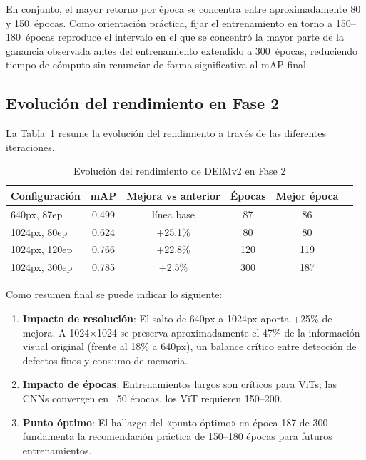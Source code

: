 En conjunto, el mayor retorno por época se concentra entre aproximadamente 80 y 150~épocas. Como orientación práctica, fijar el entrenamiento en torno a 150--180~épocas reproduce el intervalo en el que se concentró la mayor parte de la ganancia observada antes del entrenamiento extendido a 300~épocas, reduciendo tiempo de cómputo sin renunciar de forma significativa al mAP final.

\FloatBarrier
\subsection{Evolución del rendimiento en Fase 2}

La Tabla~\ref{tab:evolucion_fase2} resume la evolución del rendimiento a través de las diferentes iteraciones.

\begin{table}[htbp]
\centering
\begin{tabular}{lccccc}
\toprule
\textbf{Configuración} & \textbf{mAP} & \textbf{Mejora vs anterior} & \textbf{Épocas} & \textbf{Mejor época} \\
\midrule
640px, 87ep & 0.499 & línea base & 87 & 86 \\
1024px, 80ep & 0.624 & +25.1\% & 80 & 80 \\
1024px, 120ep & 0.766 & +22.8\% & 120 & 119 \\
1024px, 300ep & 0.785 & +2.5\% & 300 & 187 \\
\bottomrule
\end{tabular}
\caption{Evolución del rendimiento de DEIMv2 en Fase 2}
\label{tab:evolucion_fase2}
\end{table}

Como resumen final se puede indicar lo siguiente:
\begin{enumerate}
    \item \textbf{Impacto de resolución}: El salto de 640px a 1024px aporta +25\% de mejora. A 1024×1024 se preserva aproximadamente el 47\% de la información visual original (frente al 18\% a 640px), un balance crítico entre detección de defectos finos y consumo de memoria.
    \item \textbf{Impacto de épocas}: Entrenamientos largos son críticos para ViTs; las CNNs convergen en ~50 épocas, los ViT requieren 150--200.
    \item \textbf{Punto óptimo}: El hallazgo del «punto óptimo» en época 187 de 300 fundamenta la recomendación práctica de 150--180 épocas para futuros entrenamientos.
\end{enumerate}

